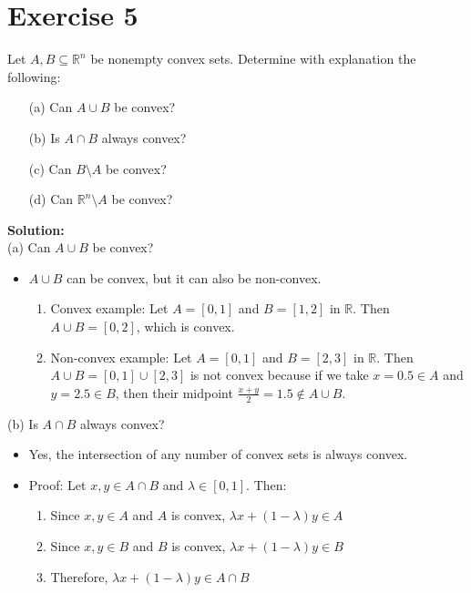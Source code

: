 \documentclass{article}
\begin{document}
\newpage

\section*{Exercise 5}
Let $A, B \subseteq \mathbb{R}^n$ be nonempty convex sets. Determine with explanation the following:
\begin{enumerate}
\item[(a)] Can $A \cup B$ be convex?
\item[(b)] Is $A \cap B$ always convex?
\item[(c)] Can $B \setminus A$ be convex?
\item[(d)] Can $\mathbb{R}^n \setminus A$ be convex?
\end{enumerate}

\textbf{Solution:} \\

(a) Can $A \cup B$ be convex?
\begin{itemize}
\item $A \cup B$ can be convex, but it can also be non-convex.
    \begin{enumerate}
    \item Convex example: Let $A = [0,1]$ and $B = [1,2]$ in $\mathbb{R}$. Then $A \cup B = [0,2]$, which is convex.
    \item Non-convex example: Let $A = [0,1]$ and $B = [2,3]$ in $\mathbb{R}$. Then $A \cup B = [0,1] \cup [2,3]$ is not convex because if we take $x = 0.5 \in A$ and $y = 2.5 \in B$, then their midpoint $\frac{x+y}{2} = 1.5 \notin A \cup B$.
    \end{enumerate}
\end{itemize}

(b) Is $A \cap B$ always convex?
\begin{itemize}
\item Yes, the intersection of any number of convex sets is always convex.
\item Proof: Let $x, y \in A \cap B$ and $\lambda \in [0,1]$. Then:
    \begin{enumerate}
    \item Since $x,y \in A$ and $A$ is convex, $\lambda x + (1-\lambda)y \in A$
    \item Since $x,y \in B$ and $B$ is convex, $\lambda x + (1-\lambda)y \in B$
    \item Therefore, $\lambda x + (1-\lambda)y \in A \cap B$
    \end{enumerate}
\end{itemize}
\end{document}

